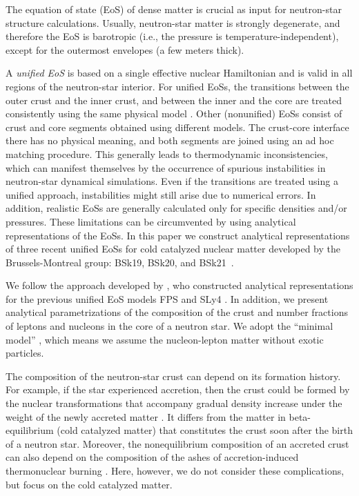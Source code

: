 \documentclass{aa}
\begin{document}
The equation of state (EoS) of dense matter is crucial as
input for neutron-star structure calculations. Usually,
neutron-star matter is strongly degenerate,  and therefore
the EoS is barotropic (i.e., the pressure is
temperature-independent), except for the outermost envelopes
(a few meters thick).

A \emph{unified EoS} is based on a single effective nuclear
Hamiltonian and is valid in  all regions of the neutron-star
interior. For unified EoSs, the transitions between the outer
crust and the inner crust, and between the inner and
the core are treated consistently using the same physical
model \citep[e.g.,][]{DouchinHaensel00,Pearson-ea12}.  Other
(nonunified) EoSs consist of crust and core segments
obtained using different models. The crust-core interface
there has no physical meaning, and both segments are joined
using an ad hoc matching procedure. This generally leads to
thermodynamic inconsistencies, which can  manifest
themselves by the occurrence of spurious instabilities in 
neutron-star dynamical simulations. Even if the transitions
are treated  using a unified approach, instabilities might
still arise due to numerical  errors. In addition, realistic
EoSs are generally calculated only for specific  densities
and/or pressures. These limitations can be circumvented  by
using analytical representations of the EoSs.  
In this paper we construct analytical representations of three recent 
unified EoSs for cold catalyzed nuclear matter developed by the Brussels-Montreal 
group: BSk19, BSk20, and BSk21~\citep{Goriely-ea10,PearsonGC11,Pearson-ea12}.

We follow the approach developed by \citet{HP04}, who
constructed analytical representations for the previous
unified EoS models FPS \citep{Pandharipande89} and SLy4
\citep{DouchinHaensel01}. In addition, we present analytical
parametrizations of the composition of the crust
and number fractions of leptons and nucleons in the
core of a neutron star. We adopt the ``minimal model''
\citep[e.g.,][]{HPY}, which means we assume the nucleon-lepton
matter without exotic particles.

The composition of the neutron-star crust can depend on its
formation history. For example, if the star experienced
accretion, then the crust could be formed by the nuclear
transformations that accompany gradual density increase
under the weight of the newly accreted matter \citep{HZ90}.
It differs from the matter in beta-equilibrium (cold
catalyzed matter) that constitutes the crust soon after the
birth of a neutron star. Moreover, the nonequilibrium
composition of an accreted crust can also depend on the
composition of the ashes of accretion-induced thermonuclear
burning \citep{HZ03}. Here, however, we do not consider
these complications, but focus on the cold catalyzed matter.
\end{document}
